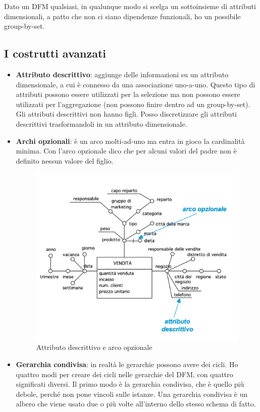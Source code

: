 Dato un DFM qualsiasi, in qualunque modo si scelga un sottoinsieme di attributi dimensionali, a patto che non ci siano dipendenze funzionali, ho un possibile group-by-set. 

\subsection{I costrutti avanzati}
\begin{itemize}
	\item 
	\textbf{Attributo descrittivo}: aggiunge delle informazioni su un attributo dimensionale, a cui è connesso da una associazione uno-a-uno. Questo tipo di attributi possono essere utilizzati per la selezione ma non possono essere utilizzati per l’aggregazione (non possono finire dentro ad un group-by-set). Gli attributi descrittivi non hanno figli. Posso discretizzare gli attributi descrittivi trasformandoli in un attributo dimensionale.  
	\item 
	\textbf{Archi opzionali}: è un arco molti-ad-uno ma entra in gioco la cardinalità minima. Con l’arco opzionale dico che per alcuni valori del padre non è definito nessun valore del figlio. 
		\begin{figure}[H]
		\centering
		\includegraphics[width=0.6\linewidth]{img/descrittivo}
		\caption{Attributo descrittivo e arco opzionale}
		\label{fig:descr}
	\end{figure}
	\item 
	\textbf{Gerarchia condivisa}: in realtà le gerarchie possono avere dei cicli. Ho quattro modi per creare dei cicli nelle gerarchie del DFM, con quattro significati diversi. Il primo modo è la gerarchia condivisa, che è quello più debole, perché non pone vincoli sulle istanze. Una gerarchia condivisa è un albero che viene usato due o più volte all’interno dello stesso schema di fatto.
	\begin{figure}[H]
		\centering

\end{figure}
\end{itemize}
